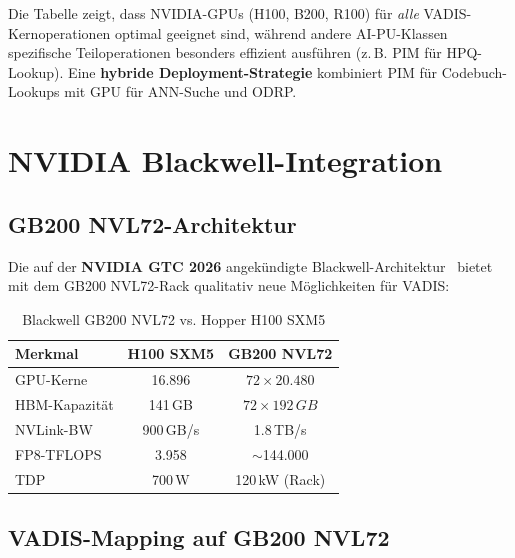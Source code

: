 ﻿\documentclass[12pt,a4paper]{article}
\begin{document}
\noindent Die Tabelle zeigt, dass NVIDIA-GPUs (H100, B200, R100) für
\emph{alle} VADIS-Kernoperationen optimal geeignet sind,
während andere AI-PU-Klassen spezifische Teiloperationen
besonders effizient ausführen (z.\,B. PIM für HPQ-Lookup).
Eine \textbf{hybride Deployment-Strategie} kombiniert
PIM für Codebuch-Lookups mit GPU für ANN-Suche und ODRP.

\section{NVIDIA Blackwell-Integration}
\label{sec:blackwell}

\subsection{GB200 NVL72-Architektur}

Die auf der \textbf{NVIDIA GTC 2026} angekündigte
Blackwell-Architektur~\cite{nvidia2025blackwell} bietet
mit dem GB200 NVL72-Rack qualitativ neue Möglichkeiten für VADIS:

\begin{table}[ht]
\centering
\small
\caption{Blackwell GB200 NVL72 vs. Hopper H100 SXM5}
\label{tab:blackwell}
\begin{tabular}{@{}lcc@{}}
\toprule
\textbf{Merkmal} & \textbf{H100 SXM5} & \textbf{GB200 NVL72} \\
\midrule
GPU-Kerne & 16.896 & $72 \times 20.480$ \\
HBM-Kapazität & 141\,GB & $72 \times 192\,GB$ \\
NVLink-BW & 900\,GB/s & 1.8\,TB/s \\
FP8-TFLOPS & 3.958 & $\sim$144.000 \\
TDP & 700\,W & 120\,kW (Rack) \\
\bottomrule
\end{tabular}
\end{table}

\subsection{VADIS-Mapping auf GB200 NVL72}
\end{document}
